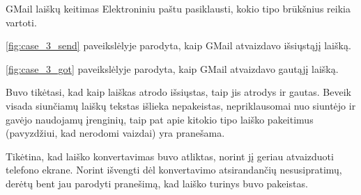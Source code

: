 \begin{xcase}{GMail laiškų keitimas}
  \xcgoal
  {
    Elektroniniu paštu pasiklausti, kokio tipo brūkšnius reikia vartoti.
  }
  
  \xctools
  {
    \ref{fig:case_3_send} paveikslėlyje parodyta, kaip GMail atvaizdavo
    išsiųstąjį laišką.

  }
  
  \xcresult
  {
    \ref{fig:case_3_got} paveikslėlyje parodyta, kaip GMail atvaizdavo
    gautąjį laišką.
    
  }
  
  \xcprinciples
  {
    {
      Buvo tikėtasi, kad kaip laiškas atrodo išsiųstas,
      taip jis atrodys ir gautas.
    }
    {
      Beveik visada siunčiamų laiškų tekstas išlieka nepakeistas,
      nepriklausomai nuo siuntėjo ir gavėjo naudojamų įrenginių, taip
      pat apie kitokio tipo laiško pakeitimus (pavyzdžiui, kad nerodomi
      vaizdai) yra pranešama.
    }
  }
  
  \xcthoughts
  {
    Tikėtina, kad laiško konvertavimas buvo atliktas, norint jį geriau
    atvaizduoti telefono ekrane. Norint išvengti dėl konvertavimo
    atsirandančių nesusipratimų, derėtų bent jau parodyti pranešimą, kad
    laiško turinys buvo pakeistas.
  }
\end{xcase}

